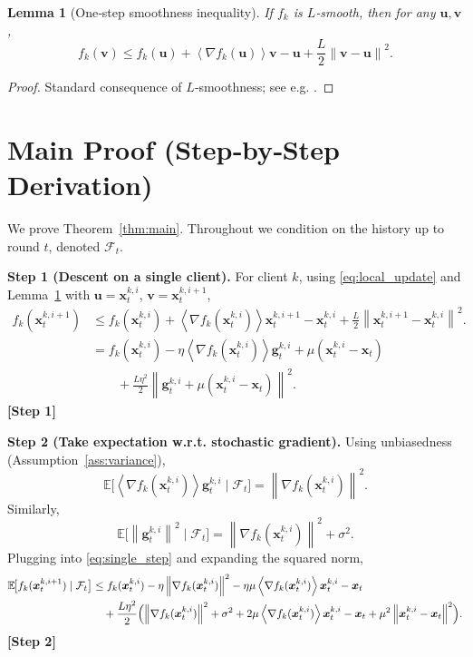 \documentclass{article}
\newtheorem{lemma}{Lemma}
\newcommand{\E}{\mathbb{E}}
\newcommand{\norm}[1]{\left\lVert #1\right\rVert}
\newcommand{\inner}[1]{\left\langle #1\right\rangle}
\begin{document}
\begin{lemma}[One‑step smoothness inequality]\label{lem:smooth}
If $f_k$ is $L$‑smooth, then for any $\bm{u},\bm{v}$,
\[
f_k(\bm{v})\le f_k(\bm{u})+\inner{\nabla f_k(\bm{u})}{\bm{v}-\bm{u}}
       +\frac{L}{2}\norm{\bm{v}-\bm{u}}^2 .
\]
\end{lemma}
\begin{proof}
Standard consequence of $L$‑smoothness; see e.g. \cite{nesterov2004introductory}.
\end{proof}

\section*{Main Proof (Step‑by‑Step Derivation)}
We prove Theorem~\ref{thm:main}.  Throughout we condition on the history up to
round $t$, denoted $\mathcal{F}_t$.

\noindent\textbf{Step 1 (Descent on a single client).}
For client $k$, using \eqref{eq:local_update} and Lemma~\ref{lem:smooth} with
$\bm{u}=\bm{x}_{t}^{k,i}$, $\bm{v}= \bm{x}_{t}^{k,i+1}$,
\begin{align}
f_k(\bm{x}_{t}^{k,i+1})
&\le f_k(\bm{x}_{t}^{k,i})
   +\inner{\nabla f_k(\bm{x}_{t}^{k,i})}{\bm{x}_{t}^{k,i+1}-\bm{x}_{t}^{k,i}}
   +\frac{L}{2}\norm{\bm{x}_{t}^{k,i+1}-\bm{x}_{t}^{k,i}}^2 . \nonumber\\
&= f_k(\bm{x}_{t}^{k,i})
   -\eta\inner{\nabla f_k(\bm{x}_{t}^{k,i})}{\bm{g}_{t}^{k,i}
        +\mu(\bm{x}_{t}^{k,i}-\bm{x}_t)} \nonumber\\
&\qquad
   +\frac{L\eta^{2}}{2}\norm{\bm{g}_{t}^{k,i}
        +\mu(\bm{x}_{t}^{k,i}-\bm{x}_t)}^{2} .
\label{eq:single_step}
\end{align}
\textbf{[Step 1]}

\noindent\textbf{Step 2 (Take expectation w.r.t. stochastic gradient).}
Using unbiasedness (Assumption~\ref{ass:variance}),
\[
\E\!\bigl[\inner{\nabla f_k(\bm{x}_{t}^{k,i})}{\bm{g}_{t}^{k,i}}
       \mid \mathcal{F}_t\bigr]
   = \norm{\nabla f_k(\bm{x}_{t}^{k,i})}^{2}.
\]
Similarly,
\[
\E\!\bigl[\norm{\bm{g}_{t}^{k,i}}^{2}\mid\mathcal{F}_t\bigr]
   = \norm{\nabla f_k(\bm{x}_{t}^{k,i})}^{2} + \sigma^{2}.
\]
Plugging into \eqref{eq:single_step} and expanding the squared norm,
\begin{align}
\E\!\bigl[f_k(\bm{x}_{t}^{k,i+1})\mid\mathcal{F}_t\bigr]
&\le f_k(\bm{x}_{t}^{k,i})
   -\eta\norm{\nabla f_k(\bm{x}_{t}^{k,i})}^{2}
   -\eta\mu\inner{\nabla f_k(\bm{x}_{t}^{k,i})}{\bm{x}_{t}^{k,i}-\bm{x}_t} \nonumber\\
&\quad
   +\frac{L\eta^{2}}{2}\Bigl(
        \norm{\nabla f_k(\bm{x}_{t}^{k,i})}^{2}
      + \sigma^{2}
      + 2\mu\inner{\nabla f_k(\bm{x}_{t}^{k,i})}{\bm{x}_{t}^{k,i}-\bm{x}_t}
      + \mu^{2}\norm{\bm{x}_{t}^{k,i}-\bm{x}_t}^{2}
      \Bigr) .
\label{eq:expect_step}
\end{align}
\textbf{[Step 2]}
\end{document}
